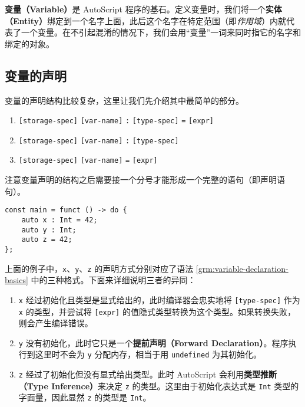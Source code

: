 \textbf{变量（Variable）}是 AutoScript 程序的基石。定义变量时，我们将一个\textbf{实体（Entity）}绑定到一个名字上面，此后这个名字在特定范围（即\emph{作用域}）内就代表了一个变量。在不引起混淆的情况下，我们会用“变量”一词来同时指它的名字和绑定的对象。

\subsection{变量的声明}

变量的声明结构比较复杂，这里让我们先介绍其中最简单的部分。

\begin{grammar} \label{grm:variable-declaration-basics}
\begin{enumerate}
	\item \texttt{[storage-spec]} \texttt{[var-name]} \lstinline!:! \texttt{[type-spec]} \lstinline!=! \texttt{[expr]}
	\item \texttt{[storage-spec]} \texttt{[var-name]} \lstinline!:! \texttt{[type-spec]}
	\item \texttt{[storage-spec]} \texttt{[var-name]} \lstinline!=! \texttt{[expr]}
\end{enumerate}
\end{grammar}

注意变量声明的结构之后需要接一个分号才能形成一个完整的语句（即声明语句）。

\begin{lstlisting}
const main = funct () -> do {
    auto x : Int = 42;
    auto y : Int;
    auto z = 42;
};
\end{lstlisting}

上面的例子中，\lstinline!x!、\lstinline!y!、\lstinline!z! 的声明方式分别对应了语法 \ref{grm:variable-declaration-basics} 中的三种格式。下面来详细说明三者的异同：

\begin{enumerate}
    \item \lstinline!x! 经过初始化且类型是显式给出的，此时编译器会忠实地将 \texttt{[type-spec]} 作为 \lstinline!x! 的类型，并尝试将 \texttt{[expr]} 的值隐式类型转换为这个类型。如果转换失败，则会产生编译错误。

    \item \lstinline!y! 没有初始化，此时它只是一个\textbf{提前声明（Forward Declaration）}。程序执行到这里时不会为 \lstinline!y! 分配内存，相当于用 \lstinline!undefined! 为其初始化。

    \item \lstinline!z! 经过了初始化但没有显式给出类型。此时 AutoScript 会利用\textbf{类型推断（Type Inference）}来决定 \lstinline!z! 的类型。这里由于初始化表达式是 \lstinline!Int! 类型的字面量，因此显然 \lstinline!z! 的类型是 \lstinline!Int!。
\end{enumerate}

